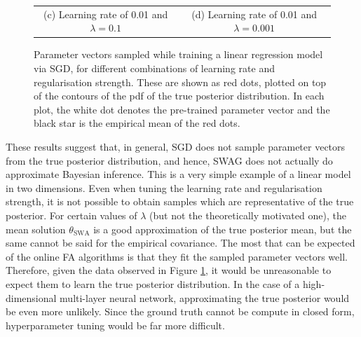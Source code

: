 \documentclass[msc,deptreport.inf]{infthesis} %
\begin{document}
\begin{figure}[!htbp]
\begin{tabular}{cc}
		 (c) Learning rate of 0.01 and $\lambda = 0.1$
		 & (d) Learning rate of 0.01 and $\lambda = 0.001$ \\[6pt]
	\end{tabular}
	\caption{Parameter vectors sampled while training a linear regression model via SGD, for different combinations of learning rate and regularisation strength. These are shown as red dots, plotted on top of the contours of the pdf of the true posterior distribution. In each plot, the white dot denotes the pre-trained parameter vector and the black star is the empirical mean of the red dots.}
	\label{fig:linear_regression_pdfs}
\end{figure}

These results suggest that, in general, SGD does not sample parameter vectors from the true posterior distribution, and hence, SWAG does not actually do approximate Bayesian inference. This is a very simple example of a linear model in two dimensions. Even when tuning the learning rate and regularisation strength, it is not possible to obtain samples which are representative of the true posterior. For certain values of $\lambda$ (but not the theoretically motivated one), the mean solution $\theta_{\text{SWA}}$ is a good approximation of the true posterior mean, but the same cannot be said for the empirical covariance. The most that can be expected of the online FA algorithms is that they fit the sampled parameter vectors well. Therefore, given the data observed in Figure \ref{fig:linear_regression_pdfs}, it would be unreasonable to expect them to learn the true posterior distribution. In the case of a high-dimensional multi-layer neural network, approximating the true posterior would be even more unlikely. Since the ground truth cannot be compute in closed form, hyperparameter tuning would be far more difficult.
 
\end{document}
